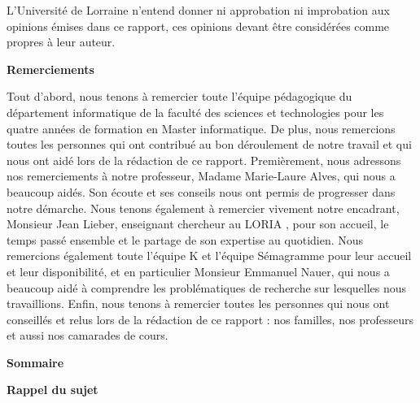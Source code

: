 \documentclass[11pt]{article}
\begin{document}
L'Universit\'{e} de Lorraine n'entend donner ni approbation ni improbation aux opinions \'{e}mises dans ce rapport, ces opinions devant \^{e}tre consid\'{e}r\'{e}es comme propres \`{a} leur auteur.
\cleardoublepage


\thispagestyle{empty}
\begin{center}
{\bfseries \huge Remerciements}
\end{center}
\vspace*{10mm}

Tout d'abord, nous tenons \`{a} remercier toute l'\'{e}quipe p\'{e}dagogique du d\'{e}partement informatique de la facult\'{e} des sciences et technologies pour les quatre ann\'{e}es de formation en Master informatique.
\newline
De plus, nous remercions toutes les personnes qui ont contribu\'{e} au bon d\'{e}roulement de notre travail et qui nous ont aid\'{e} lors de la r\'{e}daction de ce rapport. Premi\`{e}rement, nous adressons nos remerciements \`{a} notre professeur, Madame Marie-Laure Alves, qui nous a beaucoup aid\'{e}s. Son \'{e}coute et ses conseils nous ont permis de progresser dans notre d\'{e}marche.
\newline
Nous tenons \'{e}galement \`{a} remercier vivement notre encadrant, Monsieur Jean Lieber, enseignant chercheur au LORIA \autocite[1]{http://www.loria.fr/fr/}, pour son accueil, le temps pass\'{e} ensemble et le partage de son expertise au quotidien. Nous remercions \'{e}galement toute l'\'{e}quipe K et l'\'{e}quipe S\'{e}magramme pour leur accueil et leur disponibilit\'{e}, et en particulier Monsieur Emmanuel Nauer, qui nous a beaucoup aid\'{e} \`{a} comprendre les probl\'{e}matiques de recherche sur lesquelles nous travaillions. Enfin, nous tenons \`{a} remercier toutes les personnes qui nous ont conseill\'{e}s et relus lors de la r\'{e}daction de ce rapport : nos familles, nos professeurs et aussi nos camarades de cours.

\cleardoublepage


\thispagestyle{empty}
\begin{center}
{\bfseries \huge Sommaire}
\end{center}
\tableofcontents



\cleardoublepage

\thispagestyle{empty}

\begin{center}
{\bfseries \huge Rappel du sujet}
\end{center}
\end{document}
